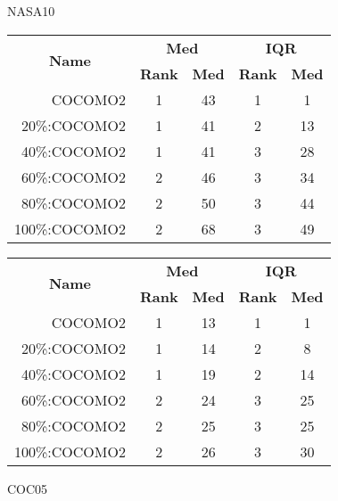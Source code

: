 \begin{figure}[!t]
\begin{center}
\caption{NASA10}
\scriptsize
\label{fig:nasa10}
\begin{tabular}{|r|c|c|c|c|}
\hline
\multicolumn{1}{|c|}{\multirow{2}{*}{\textbf{Name}}} & \multicolumn{2}{c|}{\textbf{Med}}     & \multicolumn{2}{c|}{\textbf{IQR}} \\ \cline{2-5} 
\multicolumn{1}{|c|}{}                               & \textbf{Rank} & \textbf{Med} & \textbf{Rank} & \textbf{Med} \\ \hline
    COCOMO2  & 1 & 43  & 1    & 1     \\ \cline{4-5}
20\%:COCOMO2 & 1 & 41   & 2    & 13   \\ \cline{4-5}
40\%:COCOMO2 & 1 & 41   & 3    & 28   \\ \cline{2-3}
60\%:COCOMO2 & 2 & 46   & 3    & 34   \\ 
80\%:COCOMO2 & 2 & 50  & 3    & 44  \\
100\%:COCOMO2 & 2 & 68  & 3    & 49    \\ \hline         
\end{tabular}


\caption{COC05}
\scriptsize
\label{fig:coc05}
\begin{tabular}{|r|c|c|c|c|}
\hline
\multicolumn{1}{|c|}{\multirow{2}{*}{\textbf{Name}}} & \multicolumn{2}{c|}{\textbf{Med}}     & \multicolumn{2}{c|}{\textbf{IQR}} \\ \cline{2-5} 
\multicolumn{1}{|c|}{}                               & \textbf{Rank} & \textbf{Med} & \textbf{Rank} & \textbf{Med} \\ \hline
    COCOMO2  & 1 & 13   & 1    & 1     \\ \cline{4-5}
20\%:COCOMO2 & 1 & 14   & 2    & 8    \\ 
40\%:COCOMO2 & 1 & 19   & 2    & 14    \\ \cline{2-5}
60\%:COCOMO2 & 2 & 24   & 3    & 25   \\ 
80\%:COCOMO2 & 2 & 25   & 3    & 25   \\
100\%:COCOMO2 & 2 & 26  & 3    & 30     \\ \hline    
\end{tabular}


\end{center}
\end{figure}
